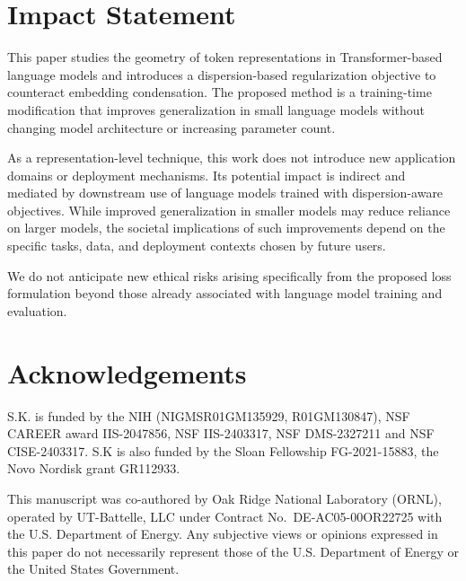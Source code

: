 \documentclass{article}
\theoremstyle{plain}
\theoremstyle{definition}
\theoremstyle{remark}
\begin{document}
\section*{Impact Statement}
This paper studies the geometry of token representations in Transformer-based language models and introduces a dispersion-based regularization objective to counteract embedding condensation. The proposed method is a training-time modification that improves generalization in small language models without changing model architecture or increasing parameter count.

As a representation-level technique, this work does not introduce new application domains or deployment mechanisms. Its potential impact is indirect and mediated by downstream use of language models trained with dispersion-aware objectives. While improved generalization in smaller models may reduce reliance on larger models, the societal implications of such improvements depend on the specific tasks, data, and deployment contexts chosen by future users.

We do not anticipate new ethical risks arising specifically from the proposed loss formulation beyond those already associated with language model training and evaluation.


\section*{Acknowledgements}

S.K. is funded by the NIH (NIGMSR01GM135929, R01GM130847), NSF CAREER award IIS-2047856, NSF IIS-2403317, NSF DMS-2327211 and NSF CISE-2403317. S.K is also funded by the Sloan Fellowship FG-2021-15883, the Novo Nordisk grant GR112933.

This manuscript was co-authored by Oak Ridge National Laboratory (ORNL), operated by UT-Battelle, LLC under Contract No.~DE-AC05-00OR22725 with the U.S. Department of Energy. Any subjective views or opinions expressed in this paper do not necessarily represent those of the U.S. Department of Energy or the United States Government.





\renewcommand{\thefigure}{S\arabic{figure}}
\renewcommand{\theHfigure}{S\arabic{figure}}
\setcounter{figure}{0}
\renewcommand{\thetable}{S\arabic{table}}
\renewcommand{\theHtable}{S\arabic{table}}
\setcounter{table}{0}

\clearpage
\newpage
\end{document}
